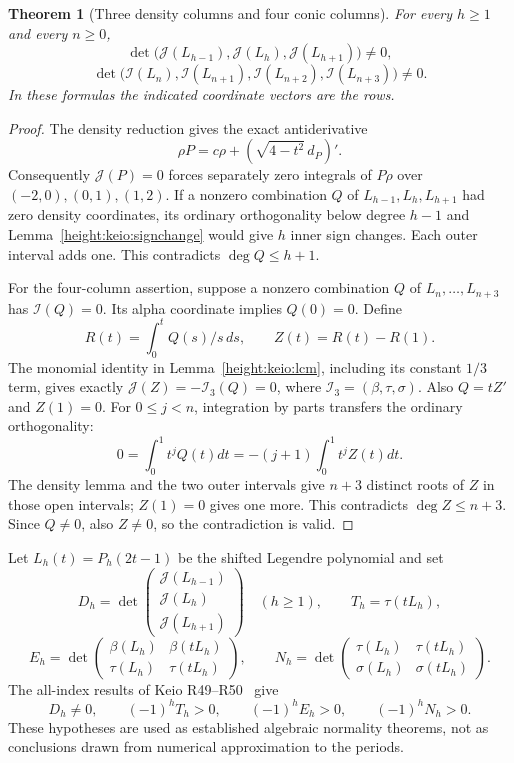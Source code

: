 \documentclass[11pt,a4paper]{article}
\numberwithin{equation}{section}
\newtheorem{theorem}{Theorem}[section]
\theoremstyle{definition}\newtheorem{definition}[theorem]{Definition}
\theoremstyle{remark}\newtheorem{remark}[theorem]{Remark}
\begin{document}
\begin{theorem}[Three density columns and four conic columns]
\label{height:keio:normality}
For every $h\ge1$ and every $n\ge0$,
\[
 \det\bigl(\mathcal J(L_{h-1}),\mathcal J(L_h),
                         \mathcal J(L_{h+1})\bigr)\ne0,
\]
\[
 \det\bigl(\mathcal I(L_n),\mathcal I(L_{n+1}),
              \mathcal I(L_{n+2}),\mathcal I(L_{n+3})\bigr)\ne0.
\]
In these formulas the indicated coordinate vectors are the rows.
\end{theorem}
\begin{proof}
The density reduction gives the exact antiderivative
\[
 \rho P=c\rho+(\sqrt{4-t^2}\,d_P)' .
\]
Consequently $\mathcal J(P)=0$ forces separately zero integrals of
$P\rho$ over $(-2,0),(0,1),(1,2)$. If a nonzero combination $Q$ of
$L_{h-1},L_h,L_{h+1}$ had zero density coordinates, its ordinary
orthogonality below degree $h-1$ and Lemma~\ref{height:keio:signchange}
would give $h$ inner sign changes. Each outer interval adds one.
This contradicts $\deg Q\le h+1$.

For the four-column assertion, suppose a nonzero combination $Q$ of
$L_n,\ldots,L_{n+3}$ has $\mathcal I(Q)=0$. Its alpha coordinate
implies $Q(0)=0$. Define
\[
 R(t)=\int_0^t Q(s)/s\,ds,\qquad Z(t)=R(t)-R(1).
\]
The monomial identity in Lemma~\ref{height:keio:lcm}, including its constant
$1/3$ term, gives exactly $\mathcal J(Z)=-\mathcal I_3(Q)=0$,
where $\mathcal I_3=(\beta,\tau,\sigma)$. Also $Q=tZ'$ and
$Z(1)=0$. For $0\le j<n$, integration by parts transfers the ordinary
orthogonality:
\[
 0=\int_0^1t^jQ(t)dt=-(j+1)\int_0^1t^jZ(t)dt.
\]
The density lemma and the two outer intervals give $n+3$ distinct
roots of $Z$ in those open intervals; $Z(1)=0$ gives one more.
This contradicts $\deg Z\le n+3$. Since $Q\ne0$, also $Z\ne0$,
so the contradiction is valid.
\end{proof}

Let $L_h(t)=P_h(2t-1)$ be the shifted Legendre polynomial and set
\[
 D_h=\det\begin{pmatrix}
 \mathcal J(L_{h-1})\\\mathcal J(L_h)\\\mathcal J(L_{h+1})
 \end{pmatrix}\quad(h\ge1),\qquad
 T_h=\tau(tL_h),
\]
\[
 E_h=\det\begin{pmatrix}\beta(L_h)&\beta(tL_h)\\
                         \tau(L_h)&\tau(tL_h)\end{pmatrix},
 \qquad
 N_h=\det\begin{pmatrix}\tau(L_h)&\tau(tL_h)\\
                         \sigma(L_h)&\sigma(tL_h)\end{pmatrix}.
\]
The all-index results of Keio R49--R50~\cite{K49,K50} give
\[
 D_h\ne0,\qquad (-1)^hT_h>0,\qquad
 (-1)^hE_h>0,\qquad(-1)^hN_h>0.
\]
These hypotheses are used as established algebraic normality theorems,
not as conclusions drawn from numerical approximation to the periods.
\end{document}
